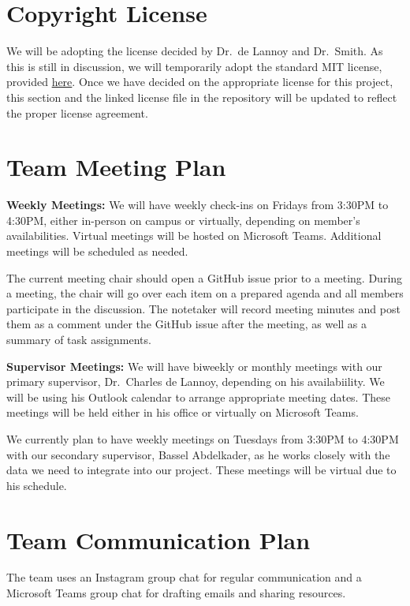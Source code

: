 \documentclass{article}
\begin{document}
\section{Copyright License}

We will be adopting the license decided by Dr.\ de Lannoy and Dr.\ Smith. As this is
still in discussion, we will temporarily adopt the standard MIT license, provided
\href{https://github.com/SumanyaG/Alkalytics/blob/main/LICENSE}{here}. Once we have
decided on the appropriate license for this project, this section and the linked
license file in the repository will be updated to reflect the proper license
agreement.

\section{Team Meeting Plan}
\noindent \textbf{Weekly Meetings:}
We will have weekly check-ins on Fridays from 3:30PM to 4:30PM, either in-person 
on campus or virtually, depending on member's availabilities. Virtual meetings 
will be hosted on Microsoft Teams. Additional meetings will be scheduled as needed.

The current meeting chair should open a GitHub issue prior to a meeting. During a 
meeting, the chair will go over each item on a prepared agenda and all members 
participate in the discussion. The notetaker will record meeting minutes and post 
them as a comment under the GitHub issue after the meeting, as well as a summary of
task assignments.

\noindent \textbf{Supervisor Meetings:}
We will have biweekly or monthly meetings with our primary supervisor, Dr.\ Charles
de Lannoy, depending on his availabiility. We will be using his Outlook calendar to
arrange appropriate meeting dates. These meetings will be held either in his
office or virtually on Microsoft Teams.

We currently plan to have weekly meetings on Tuesdays from 3:30PM to 4:30PM with
our secondary supervisor, Bassel Abdelkader, as he works closely with the data 
we need to integrate into our project. These meetings will be virtual due
to his schedule.

\section{Team Communication Plan}

The team uses an Instagram group chat for regular communication and a Microsoft Teams 
group chat for drafting emails and sharing resources.
\end{document}
